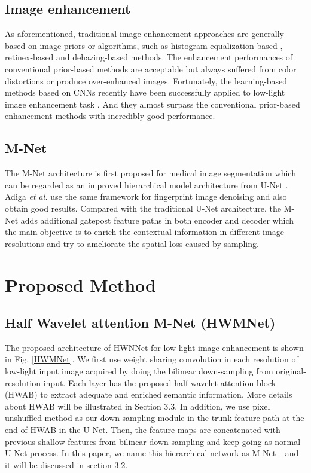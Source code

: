\documentclass{article}
\begin{document}
\subsection{Image enhancement}
As aforementioned, traditional image enhancement approaches are generally based on image priors or algorithms, such as histogram equalization-based \cite{adaptive, contrast}, retinex-based \cite{MSR} and dehazing-based \cite{DCP} methods. The enhancement performances of conventional prior-based methods are acceptable but always suffered from color distortions or produce over-enhanced images. Fortunately, the learning-based methods based on CNNs recently have been successfully applied to low-light image enhancement task \cite{2019ntire}. And they almost surpass the conventional prior-based enhancement methods \cite{ 01, kind, kind++, RUAS, LLFlow} with incredibly good performance.




\subsection{M-Net}
The M-Net architecture is first proposed for medical image segmentation \cite{mnet} which can be regarded as an improved hierarchical model architecture from U-Net \cite{unet}. Adiga \emph{et al.}\cite{fpd} use the same framework for fingerprint image denoising and also obtain good results. Compared with the traditional U-Net architecture, the M-Net adds additional gatepost feature paths in both encoder and decoder which the main objective is to enrich the contextual information in different image resolutions and try to ameliorate the spatial loss caused by sampling.



\section{Proposed Method}


\subsection{Half Wavelet attention M-Net (HWMNet)}
The proposed architecture of HWNNet for low-light image enhancement is shown in Fig. \ref{HWMNet}. We first use  weight sharing convolution in each resolution of low-light input image acquired by doing the bilinear down-sampling from original-resolution input. Each layer has the proposed half wavelet attention block (HWAB) to extract adequate and enriched semantic information. More details about HWAB will be illustrated in Section 3.3. In addition, we use pixel unshuffled \cite{RDN} method as our down-sampling module in the trunk feature path at the end of HWAB in the U-Net. Then, the feature maps are concatenated with previous shallow features from bilinear down-sampling and keep going as normal U-Net process. In this paper, we name this hierarchical network as M-Net+ and it will be discussed in section 3.2. 
\end{document}
